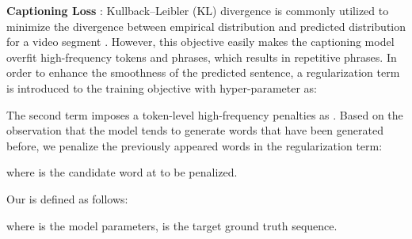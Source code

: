 \documentclass[letterpaper]{article} \usepackage{aaai23}  \usepackage{times}  \usepackage{helvet}  \usepackage{courier}  \usepackage[hyphens]{url}  \usepackage{graphicx} \urlstyle{rm} \def\UrlFont{\rm}  \usepackage{natbib}  \usepackage{caption} \frenchspacing  \setlength{\pdfpagewidth}{8.5in}  \setlength{\pdfpageheight}{11in}  \usepackage{algorithm}
\begin{document}
\noindent\textbf{Captioning Loss }:  
Kullback–Leibler (KL) divergence is commonly utilized
to minimize the divergence between empirical distribution  and 
predicted distribution  for a video segment . 
However, this objective easily makes the captioning model overfit high-frequency tokens and phrases, which results in repetitive phrases. In order to enhance the smoothness of the predicted sentence, a regularization term  is introduced to the training objective with hyper-parameter  as:

\vspace{-2mm}

The second term  imposes a token-level high-frequency penalties as \cite{Song2021}. Based on the observation that the model tends to generate words that have been generated before, we penalize the previously appeared words in the regularization term:  


where  is the candidate word at  to be penalized.

\noindent Our  is defined as follows:


where  is the model parameters,  is the target ground truth sequence. 
\end{document}
